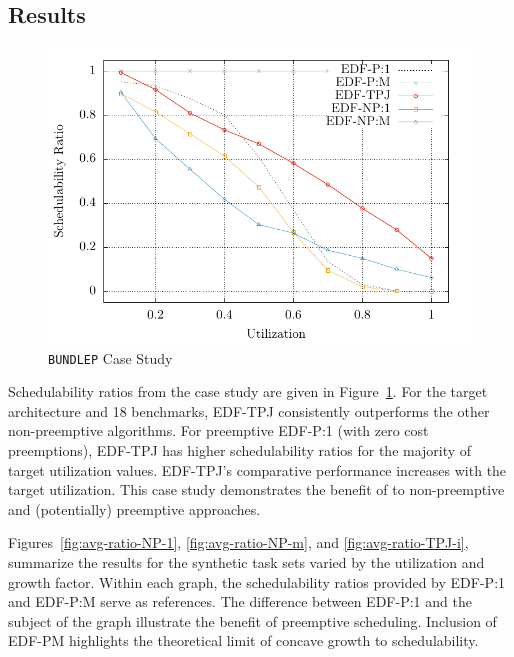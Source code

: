 \subsection{Results}
\newcommand{\cwidth}{.48\linewidth}


\begin{figure}
  \includegraphics[width=\linewidth]{plot/cs-ratio/cs-ratio}
  \caption{\texttt{BUNDLEP} Case Study}
  \label{fig:cs-ratio}
\end{figure}

Schedulability ratios from the \bundlep{} case study are given in
Figure~\ref{fig:cs-ratio}. For the target architecture and 18 benchmarks, EDF-TPJ consistently outperforms the other non-preemptive
algorithms. For preemptive EDF-P:1 (with zero cost preemptions), EDF-TPJ
has higher schedulability ratios for the majority of target
utilization values. EDF-TPJ's comparative performance increases
with the target utilization. This case study demonstrates the benefit
of \tpj{} to non-preemptive and (potentially) preemptive approaches.
 
Figures~\ref{fig:avg-ratio-NP-1}, \ref{fig:avg-ratio-NP-m}, and
\ref{fig:avg-ratio-TPJ-i}, summarize the results for the synthetic
task sets varied by the utilization and growth factor. Within
each graph, the schedulability ratios provided by EDF-P:1 and EDF-P:M serve as
references. The difference between EDF-P:1 and the subject of the
graph illustrate the benefit of preemptive scheduling. Inclusion of
EDF-PM highlights the theoretical limit of concave growth to
schedulability.


